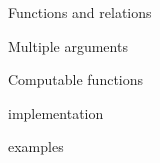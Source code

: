 \begin{plSection}{Functions and relations}
\begin{plSection}{Multiple arguments}
\end{plSection}%
\begin{plSection}{Computable functions}
\end{plSection}%
\begin{plSection}{implementation}
\end{plSection}%
\begin{plSection}{examples}
\end{plSection}%
\end{plSection}%


